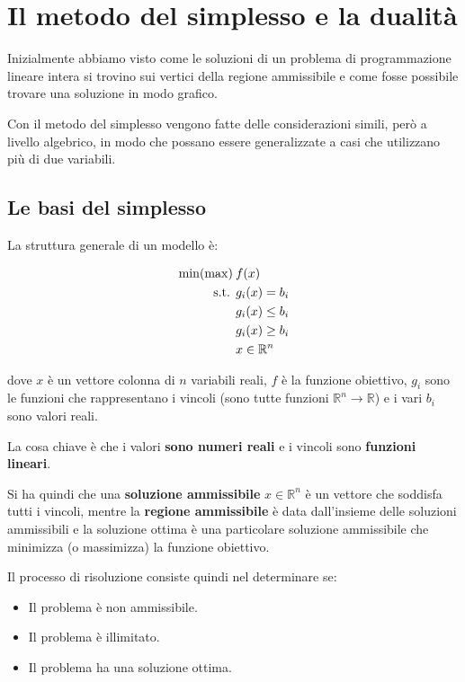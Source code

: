 
\chapter{Il metodo del simplesso e la dualità}

Inizialmente abbiamo visto come le soluzioni di un problema di programmazione lineare intera si trovino sui vertici della regione ammissibile e come fosse possibile trovare una soluzione in modo grafico.

Con il metodo del simplesso vengono fatte delle considerazioni simili, però a livello algebrico, in modo che possano essere generalizzate a casi che utilizzano più di due variabili.

\section{Le basi del simplesso}

La struttura generale di un modello è:

\begin{align*}
	\min(\max)\: &f(x) \\
		\text{s.t. } &g_i(x) = b_i \\
			&g_i(x) \leq b_i \\
			&g_i(x) \geq b_i \\
			&x \in \mathbb{R}^n
\end{align*}

\noindent dove $x$ è un vettore colonna di $n$ variabili reali, $f$ è la funzione obiettivo, $g_i$ sono le funzioni che rappresentano i vincoli (sono tutte funzioni $\mathbb{R}^n \to \mathbb{R}$) e i vari $b_i$ sono valori reali.

La cosa chiave è che i valori \textbf{sono numeri reali} e i vincoli sono \textbf{funzioni lineari}.

Si ha quindi che una \textbf{soluzione ammissibile} $x \in \mathbb{R}^n$ è un vettore che soddisfa tutti i vincoli, mentre la \textbf{regione ammissibile} è data dall'insieme delle soluzioni ammissibili e la soluzione ottima è una particolare soluzione ammissibile che minimizza (o massimizza) la funzione obiettivo.

Il processo di risoluzione consiste quindi nel determinare se:

\begin{itemize}
	\item Il problema è non ammissibile.
	\item Il problema è illimitato.
	\item Il problema ha una soluzione ottima.
\end{itemize}

